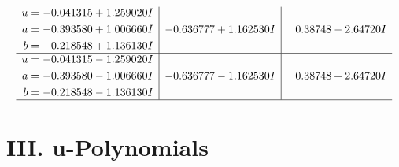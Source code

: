 \documentclass[1p]{elsarticle_modified}
\theoremstyle{definition}
\begin{document}
$$\begin{array}{c|c|c}
\begin{aligned}
u &= -0.041315 + 1.259020 I \\
a &= -0.393580 + 1.006660 I \\
b &= -0.218548 + 1.136130 I\end{aligned}
 & -0.636777 + 1.162530 I & \phantom{-}0.38748 - 2.64720 I \\ \hline\begin{aligned}
u &= -0.041315 - 1.259020 I \\
a &= -0.393580 - 1.006660 I \\
b &= -0.218548 - 1.136130 I\end{aligned}
 & -0.636777 - 1.162530 I & \phantom{-}0.38748 + 2.64720 I\\
 \hline 
 \end{array}$$\newpage
\newpage\renewcommand{\arraystretch}{1}
\centering \section*{ III. u-Polynomials}
\end{document}
